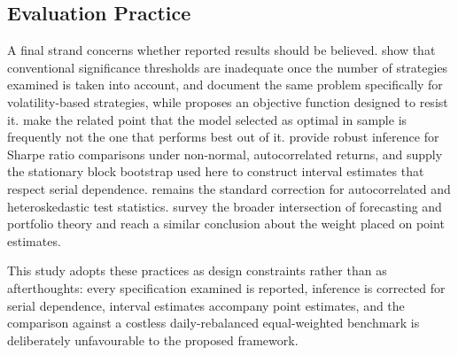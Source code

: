 \subsection{Evaluation Practice}

A final strand concerns whether reported results should be believed.
\citet{harvey15} show that conventional significance thresholds are inadequate once the
number of strategies examined is taken into account, and \citet{valls26} document the
same problem specifically for volatility-based strategies, while \citet{sheppert26}
proposes an objective function designed to resist it. \citet{zhangz25} make the related
point that the model selected as optimal in sample is frequently not the one that
performs best out of it. \citet{ledoit08} provide
robust inference for Sharpe ratio comparisons under non-normal, autocorrelated returns,
and \citet{politis94} supply the stationary block bootstrap used here to construct
interval estimates that respect serial dependence. \citet{newey87} remains the standard
correction for autocorrelated and heteroskedastic test statistics.
\citet{raimundo26} survey the broader intersection of forecasting and portfolio theory
and reach a similar conclusion about the weight placed on point estimates.

This study adopts these practices as design constraints rather than as afterthoughts:
every specification examined is reported, inference is corrected for serial dependence,
interval estimates accompany point estimates, and the comparison against a costless
daily-rebalanced equal-weighted benchmark is deliberately unfavourable to the proposed
framework.
